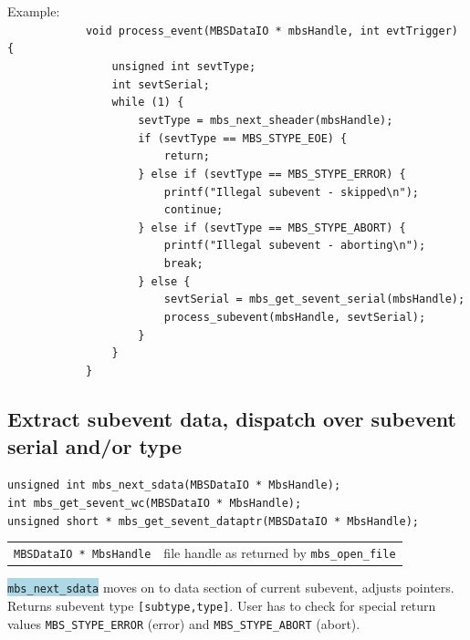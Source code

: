 \documentclass[10pt,a4paper]{article}
\newcommand{\blue}[1]{\colorbox{lightblue}{\texttt{#1}}}
\newenvironment{yellowboxed}
	{\begin{Sbox}\begin{minipage}[t]}
	{\end{minipage}\end{Sbox}\colorbox{yellow}{\TheSbox}}
\newenvironment{blueboxed}
	{\begin{Sbox}\begin{minipage}[t]}
	{\end{minipage}\end{Sbox}\colorbox{lightblue}{\TheSbox}}
\begin{document}
\begin{yellowboxed}{\linewidth}
Example:\\
\verb+            void process_event(MBSDataIO * mbsHandle, int evtTrigger) {+\\
\verb+                unsigned int sevtType;+\\
\verb+                int sevtSerial;+\\
\verb+                while (1) {+\\
\verb+                    sevtType = mbs_next_sheader(mbsHandle);+\\
\verb+                    if (sevtType == MBS_STYPE_EOE) {+\\
\verb+                        return;+\\
\verb+                    } else if (sevtType == MBS_STYPE_ERROR) {+\\
\verb+                        printf("Illegal subevent - skipped\n");+\\
\verb+                        continue;+\\
\verb+                    } else if (sevtType == MBS_STYPE_ABORT) {+\\
\verb+                        printf("Illegal subevent - aborting\n");+\\
\verb+                        break;+\\
\verb+                    } else {+\\
\verb+                        sevtSerial = mbs_get_sevent_serial(mbsHandle);+\\
\verb+                        process_subevent(mbsHandle, sevtSerial);+\\
\verb+                    }+\\
\verb+                }+\\
\verb+            }+
\end{yellowboxed}
\newpage
\subsection{Extract subevent data, dispatch over subevent serial and/or type}\vspace{3mm}
\begin{center}
\begin{blueboxed}{.8\linewidth}
	\verb+unsigned int mbs_next_sdata(MBSDataIO * MbsHandle);+\\
	\verb+int mbs_get_sevent_wc(MBSDataIO * MbsHandle);+\\
	\verb+unsigned short * mbs_get_sevent_dataptr(MBSDataIO * MbsHandle);+
\end{blueboxed}
\end{center}
\begin{center}
\begin{tabular}{ll}
\verb+MBSDataIO * MbsHandle+	& file handle as returned by \verb+mbs_open_file+\\
\end{tabular}
\end{center}
\blue{mbs\_next\_sdata} moves on to data section of current subevent, adjusts pointers.
Returns subevent type \verb+[subtype,type]+.
User has to check for special return values 
\verb+MBS_STYPE_ERROR+ (error) and \verb+MBS_STYPE_ABORT+ (abort).
\end{document}
